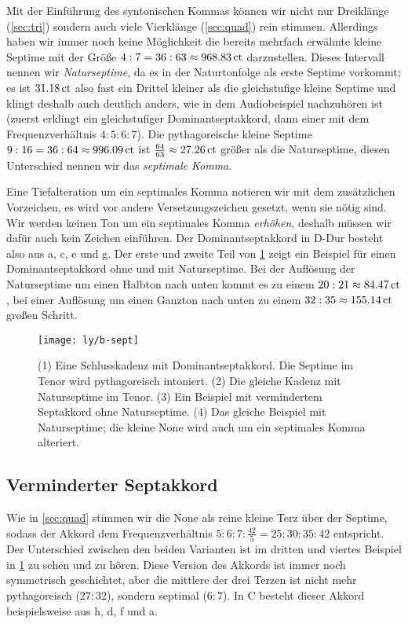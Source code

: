 Mit der Einführung des syntonischen Kommas können wir nicht nur Dreiklänge
(\cref{sec:tri}) sondern auch viele Vierklänge (\cref{sec:quad}) rein stimmen.
Allerdings haben wir immer noch keine Möglichkeit die bereits mehrfach erwähnte
kleine Septime mit der Größe $4:7=36:63\approx 968.83\,\mathrm{ct}$ darzustellen.
Dieses Intervall nennen wir \emph{Naturseptime}, da es in der Naturtonfolge als
erste Septime vorkommt; es ist $31.18\,\mathrm{ct}$ also fast ein Drittel 
kleiner als die gleichstufige kleine Septime und klingt deshalb auch deutlich
anders, wie in dem Audiobeispiel nachzuhören ist (zuerst erklingt
ein gleichstufiger Dominantseptakkord, dann einer mit dem Frequenzverhältnis
$4:5:6:7$). Die pythagoreische kleine Septime
$9:16=36:64\approx 996.09\,\mathrm{ct}$ ist $\frac{64}{63}\approx 27.26\,\mathrm{ct}$
größer als die Naturseptime, diesen Unterschied nennen wir das
\emph{septimale Komma}.

Eine Tiefalteration um ein septimales Komma notieren wir mit dem zusätzlichen
\septimal Vorzeichen, es wird vor andere Versetzungszeichen gesetzt, wenn sie
nötig sind. Wir werden keinen Ton um ein septimales Komma \emph{erhöhen},
deshalb müssen wir dafür auch kein Zeichen einführen. Der Dominantseptakkord in
D-Dur besteht also aus a, \sharpm c, e und \septimal g. Der erste und zweite
Teil von \cref{fig:sept} zeigt ein Beispiel für einen Dominantseptakkord ohne
und mit Naturseptime. Bei der Auflösung der Naturseptime um einen Halbton nach
unten kommt es zu einem $20:21\approx 84.47\,\mathrm{ct}$, bei einer Auflösung um
einen Ganzton nach unten zu einem $32:35\approx 155.14\,\mathrm{ct}$ großen Schritt.

\begin{figure}
	\centering
	\texttt{[image: ly/b-sept]}
	\caption{(1) Eine Schlusskadenz mit Dominantseptakkord. Die Septime im
		Tenor wird pythagoreisch intoniert.
		\quad(2) Die gleiche Kadenz mit Naturseptime im Tenor.
		\quad(3) Ein Beispiel mit vermindertem Septakkord ohne Naturseptime.
		\quad(4) Das gleiche Beispiel mit Naturseptime; die kleine None wird
		auch um ein septimales Komma alteriert.}\label{fig:sept}
\end{figure}

\subsection{Verminderter Septakkord}

Wie in \cref{sec:quad} stimmen wir die None als reine kleine Terz über der
Septime, sodass der Akkord dem Frequenzverhältnis $5:6:7:\frac{42}5 = 25:30:35:42$
entspricht. Der Unterschied zwischen den beiden Varianten ist im dritten und
viertes Beispiel in \cref{fig:sept} zu sehen und zu hören. Diese Version des
Akkords ist immer noch symmetrisch geschichtet, aber die mittlere der drei
Terzen ist nicht mehr pythagoreisch ($27:32$), sondern septimal ($6:7$). In C besteht dieser Akkord beispielsweise aus \naturalm h, d, \septimal f und \septimal \flatp a.

